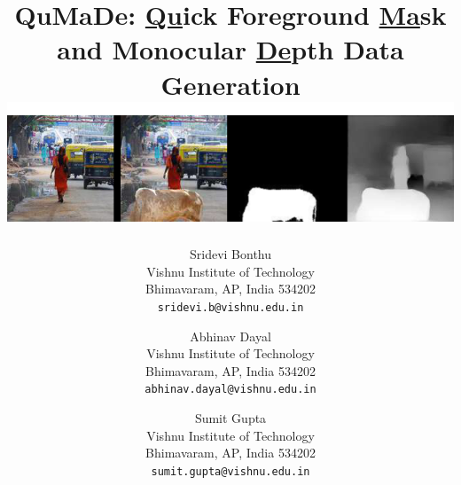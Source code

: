 \documentclass[review]{cvpr}
\begin{document}

\title{QuMaDe: \underline{Qu}ick Foreground \underline{Ma}sk and Monocular \underline{De}pth Data Generation
\includegraphics[width=1\textwidth]{samplerecord.png}
}

\author{Sridevi Bonthu\\
Vishnu Institute of Technology\\
Bhimavaram, AP, India 534202\\
{\tt\small sridevi.b@vishnu.edu.in}
\and
Abhinav Dayal\\
Vishnu Institute of Technology\\
Bhimavaram, AP, India 534202\\
{\tt\small abhinav.dayal@vishnu.edu.in}
\and
Sumit Gupta\\
Vishnu Institute of Technology\\
Bhimavaram, AP, India 534202\\
{\tt\small sumit.gupta@vishnu.edu.in}
}

\maketitle
\end{document}
